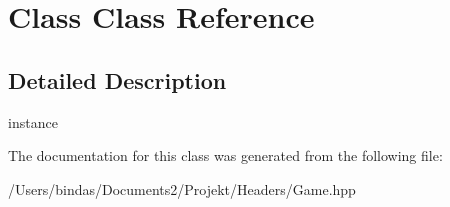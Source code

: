 \hypertarget{class_class}{}\section{Class Class Reference}
\label{class_class}


\subsection{Detailed Description}
instance 

The documentation for this class was generated from the following file\+:\begin{DoxyCompactItemize}
\item 
/\+Users/bindas/\+Documents2/\+Projekt/\+Headers/Game.\+hpp\end{DoxyCompactItemize}
